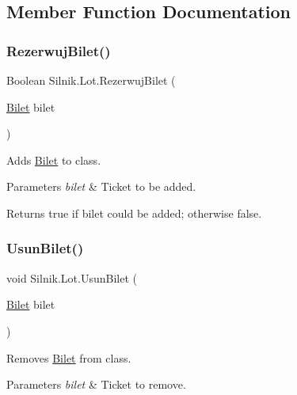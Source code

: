\subsection{Member Function Documentation}
\mbox{\label{class_silnik_1_1_lot_a2623d91a3f8fb942ece1fc785465e5a5}} 
\subsubsection{\texorpdfstring{Rezerwuj\+Bilet()}{RezerwujBilet()}}
{\footnotesize\ttfamily Boolean Silnik.\+Lot.\+Rezerwuj\+Bilet (\begin{DoxyParamCaption}\item[{\mbox{\hyperlink{class_silnik_1_1_bilet}{Bilet}}}]{bilet }\end{DoxyParamCaption})}



Adds \mbox{\hyperlink{class_silnik_1_1_bilet}{Bilet}} to class. 


\begin{DoxyParams}{Parameters}
{\em bilet} & Ticket to be added.\\
\hline
\end{DoxyParams}
\begin{DoxyReturn}{Returns}
{\ttfamily true} if bilet could be added; otherwise {\ttfamily false}.
\end{DoxyReturn}
\mbox{\label{class_silnik_1_1_lot_afc434618b4f20dd9aeb67db0adda5252}} 
\subsubsection{\texorpdfstring{Usun\+Bilet()}{UsunBilet()}}
{\footnotesize\ttfamily void Silnik.\+Lot.\+Usun\+Bilet (\begin{DoxyParamCaption}\item[{\mbox{\hyperlink{class_silnik_1_1_bilet}{Bilet}}}]{bilet }\end{DoxyParamCaption})}



Removes \mbox{\hyperlink{class_silnik_1_1_bilet}{Bilet}} from class. 


\begin{DoxyParams}{Parameters}
{\em bilet} & Ticket to remove.\\
\hline
\end{DoxyParams}


